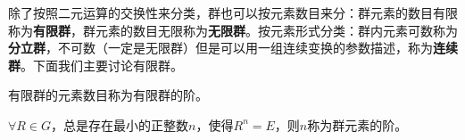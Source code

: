 除了按照二元运算的交换性来分类，群也可以按元素数目来分：群元素的数目有限称为\textbf{有限群}，群元素的数目无限称为\textbf{无限群}。按元素形式分类：群内元素可数称为\textbf{分立群}，不可数（一定是无限群）但是可以用一组连续变换的参数描述，称为\textbf{连续群}。下面我们主要讨论有限群。

\begin{definition}[有限群的阶]
    有限群的元素数目称为有限群的阶。
\end{definition}

\begin{definition}[群元素的阶]
    $\forall R\in G$，总是存在最小的正整数$n$，使得$R^n=E$，则$n$称为群元素的阶。
\end{definition}